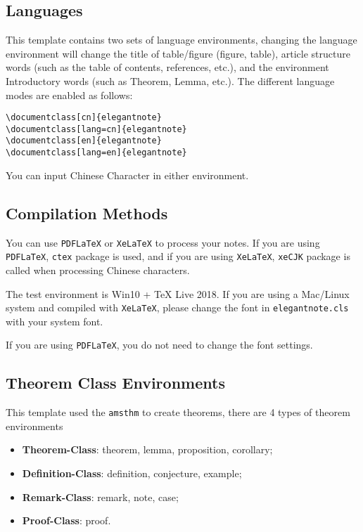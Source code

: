 \documentclass[geye,green,pad,en]{elegantnote}
\begin{document}
\subsection{Languages}
This template contains two sets of language environments, changing the language environment will change the title of table/figure (figure, table), article structure words (such as the table of contents, references, etc.), and the environment Introductory words (such as Theorem, Lemma, etc.). The different language modes are enabled as follows:
\begin{lstlisting}[frame=none]  
\documentclass[cn]{elegantnote}
\documentclass[lang=cn]{elegantnote}
\documentclass[en]{elegantnote}
\documentclass[lang=en]{elegantnote}
\end{lstlisting}
\begin{note}
You can input Chinese Character in either environment.
\end{note}

\subsection{Compilation Methods}

You can use \lstinline{PDFLaTeX} or \lstinline{XeLaTeX} to process your notes. If you are using \lstinline{PDFLaTeX}, \lstinline{ctex} package is used, and if you are using \lstinline{XeLaTeX}, \lstinline{xeCJK} package is called when processing Chinese characters. 

The test environment is Win10 + \TeX{} Live 2018. If you are using a Mac/Linux system and compiled with \lstinline{XeLaTeX},  please change the font in \lstinline{elegantnote.cls} with your system font.

\begin{note}
If you are using \lstinline{PDFLaTeX}, you do not need to change the font settings.
\end{note}

\subsection{Theorem Class Environments}
This template used the \lstinline{amsthm} to create theorems, there are 4 types of theorem environments
\begin{itemize}
\item \textbf{Theorem-Class}: theorem, lemma, proposition, corollary;
\item \textbf{Definition-Class}: definition, conjecture, example;
\item \textbf{Remark-Class}: remark, note, case;
\item \textbf{Proof-Class}: proof.
\end{itemize}
\end{document}
